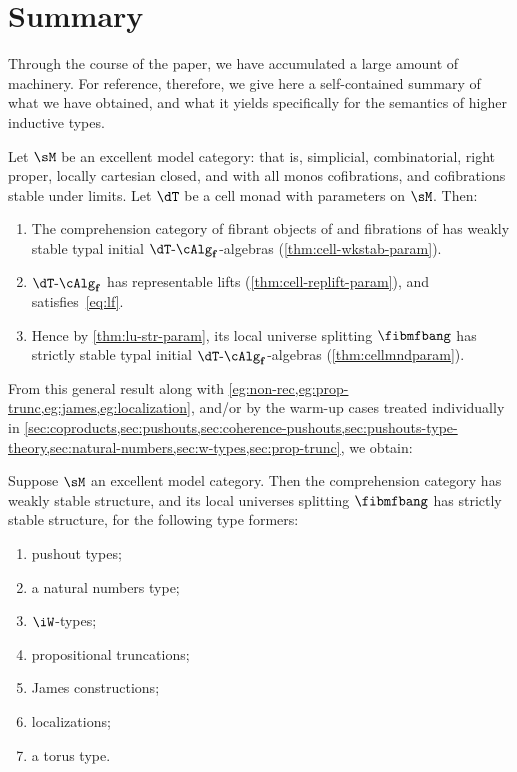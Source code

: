 \documentclass[referee]{psp}
\let\W\iW
\def\alg{\text{-}\cAlg}
\def\algf{\alg_{\mathbf{f}}}
\begin{document}
\section{Summary}
\label{sec:summary}

Through the course of the paper, we have accumulated a large amount of machinery.
%
For reference, therefore, we give here a self-contained summary of what we have obtained, and what it yields specifically for the semantics of higher inductive types.

\begin{thm}
  Let $\sM$ be an excellent model category: that is, simplicial, combinatorial, right proper, locally cartesian closed, and with all monos cofibrations, and cofibrations stable under limits.
  Let $\dT$ be a cell monad with parameters on $\sM$.
  Then:
  \begin{enumerate}
  \item The comprehension category \fibmf of fibrant objects of \sM and fibrations of \sM has weakly stable typal initial $\dT\algf$-algebras (\cref{thm:cell-wkstab-param}).
  \item $\dT\algf$ has representable lifts (\cref{thm:cell-replift-param}), and \Mf satisfies~\eqref{eq:lf}.
  \item Hence by \cref{thm:lu-str-param}, its local universe splitting $\fibmfbang$ has strictly stable typal initial $\dT\algf$-algebras (\cref{thm:cellmndparam}).
  \end{enumerate}
\end{thm}

From this general result along with \cref{eg:non-rec,eg:prop-trunc,eg:james,eg:localization}, and/or by the warm-up cases treated individually in \cref{sec:coproducts,sec:pushouts,sec:coherence-pushouts,sec:pushouts-type-theory,sec:natural-numbers,sec:w-types,sec:prop-trunc}, we obtain:
% 
\begin{thm}
  Suppose $\sM$ an excellent model category.  
  Then the comprehension category \fibmf has weakly stable structure, and its local universes splitting $\fibmfbang$ has strictly stable structure, for the following type formers:
  \begin{enumerate}
  \item pushout types;
  \item a natural numbers type;
  \item $\W$-types;
  \item propositional truncations;
  \item James constructions;
  \item localizations;
  \item a torus type.
  \end{enumerate}
\end{thm}
\end{document}
